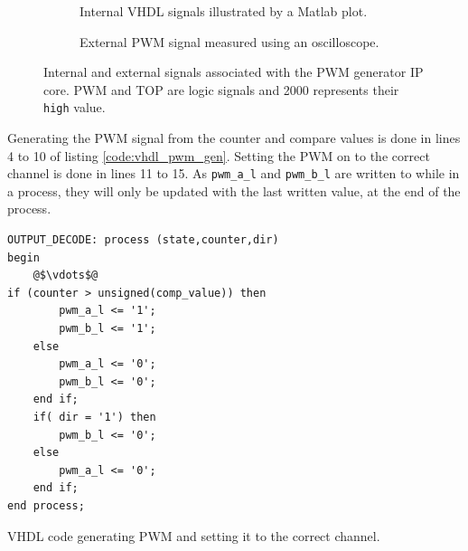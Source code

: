 \begin{figure}
    \centering
    \begin{subfigure}[b]{0.45\textwidth}
        \caption{Internal VHDL signals illustrated by a Matlab plot.}
        \label{sfig:pwm_gen_int}
    \end{subfigure}
    \begin{subfigure}[b]{0.45\textwidth}
        \caption{External PWM signal measured using an oscilloscope. }
        \label{sfig:pwm_gen_ext}
    \end{subfigure}
    \caption[Signals associated with the PWM generator IP core]{Internal and external signals associated with the PWM generator IP core. PWM and TOP are logic signals and 2000 represents their \texttt{high} value.}
    \label{fig:vhdl_pwm_gen}
\end{figure}

Generating the PWM signal from the counter and compare values is done in lines 4 to 10 of listing \ref{code:vhdl_pwm_gen}.
Setting the PWM on to the correct channel is done in lines 11 to 15.
As \texttt{pwm\_a\_l} and \texttt{pwm\_b\_l} are written to while in a process, they will only be updated with the last written value, at the end of the process.

\begin{listing}[H]
\begin{verbatim}
OUTPUT_DECODE: process (state,counter,dir)
begin
	@$\vdots$@
if (counter > unsigned(comp_value)) then
		pwm_a_l <= '1';
		pwm_b_l <= '1';
	else
		pwm_a_l <= '0';
		pwm_b_l <= '0';
	end if;	
	if( dir = '1') then 
		pwm_b_l <= '0';
	else 
		pwm_a_l <= '0';	
	end if;
end process;		
\end{verbatim}
\caption[VHDL code generating PWM signals.]{VHDL code generating PWM and setting it to the correct channel.}
\label{code:vhdl_pwm_gen}
\end{listing}


